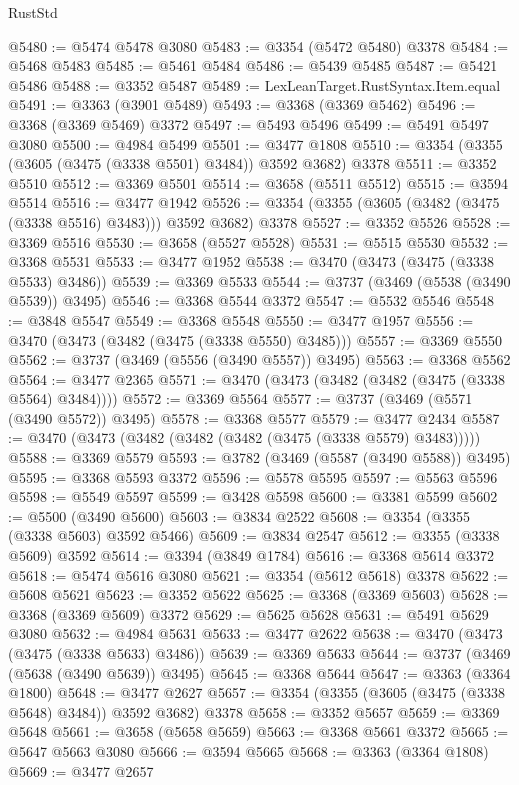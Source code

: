 \begin{lexlean}{RustStd}
\begin{coremodule}
@5480 := @5474 @5478 @3080
@5483 := @3354 (@5472 @5480) @3378
@5484 := @5468 @5483
@5485 := @5461 @5484
@5486 := @5439 @5485
@5487 := @5421 @5486
@5488 := @3352 @5487
@5489 := LexLeanTarget.RustSyntax.Item.equal
@5491 := @3363 (@3901 @5489)
@5493 := @3368 (@3369 @5462)
@5496 := @3368 (@3369 @5469) @3372
@5497 := @5493 @5496
@5499 := @5491 @5497 @3080
@5500 := @4984 @5499
@5501 := @3477 @1808
@5510 := @3354 (@3355 (@3605 (@3475 (@3338 @5501) @3484)) @3592 @3682) @3378
@5511 := @3352 @5510
@5512 := @3369 @5501
@5514 := @3658 (@5511 @5512)
@5515 := @3594 @5514
@5516 := @3477 @1942
@5526 := @3354 (@3355 (@3605 (@3482 (@3475 (@3338 @5516) @3483))) @3592 @3682) @3378
@5527 := @3352 @5526
@5528 := @3369 @5516
@5530 := @3658 (@5527 @5528)
@5531 := @5515 @5530
@5532 := @3368 @5531
@5533 := @3477 @1952
@5538 := @3470 (@3473 (@3475 (@3338 @5533) @3486))
@5539 := @3369 @5533
@5544 := @3737 (@3469 (@5538 (@3490 @5539)) @3495)
@5546 := @3368 @5544 @3372
@5547 := @5532 @5546
@5548 := @3848 @5547
@5549 := @3368 @5548
@5550 := @3477 @1957
@5556 := @3470 (@3473 (@3482 (@3475 (@3338 @5550) @3485)))
@5557 := @3369 @5550
@5562 := @3737 (@3469 (@5556 (@3490 @5557)) @3495)
@5563 := @3368 @5562
@5564 := @3477 @2365
@5571 := @3470 (@3473 (@3482 (@3482 (@3475 (@3338 @5564) @3484))))
@5572 := @3369 @5564
@5577 := @3737 (@3469 (@5571 (@3490 @5572)) @3495)
@5578 := @3368 @5577
@5579 := @3477 @2434
@5587 := @3470 (@3473 (@3482 (@3482 (@3482 (@3475 (@3338 @5579) @3483)))))
@5588 := @3369 @5579
@5593 := @3782 (@3469 (@5587 (@3490 @5588)) @3495)
@5595 := @3368 @5593 @3372
@5596 := @5578 @5595
@5597 := @5563 @5596
@5598 := @5549 @5597
@5599 := @3428 @5598
@5600 := @3381 @5599
@5602 := @5500 (@3490 @5600)
@5603 := @3834 @2522
@5608 := @3354 (@3355 (@3338 @5603) @3592 @5466)
@5609 := @3834 @2547
@5612 := @3355 (@3338 @5609) @3592
@5614 := @3394 (@3849 @1784)
@5616 := @3368 @5614 @3372
@5618 := @5474 @5616 @3080
@5621 := @3354 (@5612 @5618) @3378
@5622 := @5608 @5621
@5623 := @3352 @5622
@5625 := @3368 (@3369 @5603)
@5628 := @3368 (@3369 @5609) @3372
@5629 := @5625 @5628
@5631 := @5491 @5629 @3080
@5632 := @4984 @5631
@5633 := @3477 @2622
@5638 := @3470 (@3473 (@3475 (@3338 @5633) @3486))
@5639 := @3369 @5633
@5644 := @3737 (@3469 (@5638 (@3490 @5639)) @3495)
@5645 := @3368 @5644
@5647 := @3363 (@3364 @1800)
@5648 := @3477 @2627
@5657 := @3354 (@3355 (@3605 (@3475 (@3338 @5648) @3484)) @3592 @3682) @3378
@5658 := @3352 @5657
@5659 := @3369 @5648
@5661 := @3658 (@5658 @5659)
@5663 := @3368 @5661 @3372
@5665 := @5647 @5663 @3080
@5666 := @3594 @5665
@5668 := @3363 (@3364 @1808)
@5669 := @3477 @2657

\end{coremodule}
\end{lexlean}
